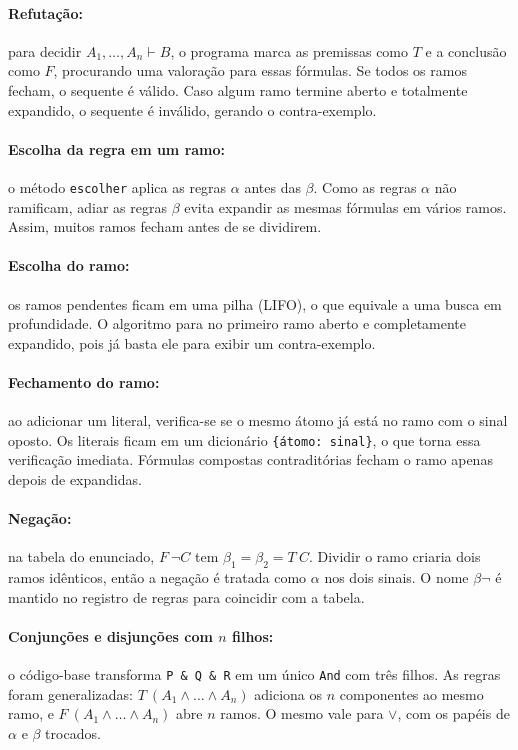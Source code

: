 \documentclass[12pt,a4paper]{article}
\begin{document}
\paragraph{Refutação:} para decidir $A_1,\dots,A_n \vdash B$, o programa marca as premissas como $T$ e a conclusão como $F$, procurando uma valoração para essas fórmulas. Se todos os ramos fecham, o sequente é válido. Caso algum ramo termine aberto e totalmente expandido, o sequente é inválido, gerando o contra-exemplo.

\paragraph{Escolha da regra em um ramo:} o método \texttt{escolher} aplica as regras $\alpha$ antes das $\beta$. Como as regras $\alpha$ não ramificam, adiar as regras $\beta$ evita expandir as mesmas fórmulas em vários ramos. Assim, muitos ramos fecham antes de se dividirem.

\paragraph{Escolha do ramo:} os ramos pendentes ficam em uma pilha (LIFO), o que equivale a uma busca em profundidade. O algoritmo para no primeiro ramo aberto e completamente expandido, pois já basta ele para exibir um contra-exemplo.

\paragraph{Fechamento do ramo:} ao adicionar um literal, verifica-se se o mesmo átomo já está no ramo com o sinal oposto. Os literais ficam em um dicionário \texttt{\{átomo: sinal\}}, o que torna essa verificação imediata. Fórmulas compostas contraditórias fecham o ramo apenas depois de expandidas.

\paragraph{Negação:} na tabela do enunciado, $F\ \neg C$ tem $\beta_1=\beta_2=T\ C$. Dividir o ramo criaria dois ramos idênticos, então a negação é tratada como $\alpha$ nos dois sinais. O nome \texttt{$\beta\neg$} é mantido no registro de regras para coincidir com a tabela.

\paragraph{Conjunções e disjunções com $n$ filhos:} o código-base transforma \texttt{P \& Q \& R} em um único \texttt{And} com três filhos. As regras foram generalizadas: $T\ (A_1\wedge\dots\wedge A_n)$ adiciona os $n$ componentes ao mesmo ramo, e $F\ (A_1\wedge\dots\wedge A_n)$ abre $n$ ramos. O mesmo vale para $\vee$, com os papéis de $\alpha$ e $\beta$ trocados.
\end{document}

